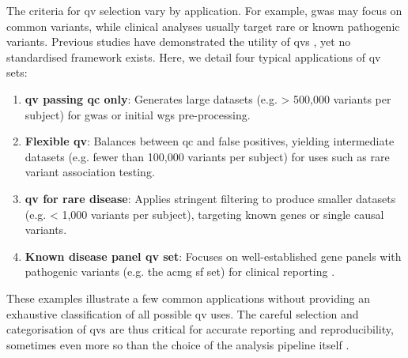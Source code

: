 The criteria for \ac{qv} selection vary by application. 
For example, \ac{gwas} may focus on common variants, while clinical analyses usually target rare or known pathogenic variants. 
Previous studies have demonstrated the utility of \ac{qv}s \cite{povysil2019rare, cirulli2015exome}, yet no standardised framework exists. 
Here, we detail four typical applications of \ac{qv} sets:
\begin{enumerate}
    \item \textbf{\ac{qv} passing \ac{qc} only}: Generates large datasets (e.g. > 500,000 variants per subject) for \ac{gwas} or initial \ac{wgs} pre-processing.
    \item \textbf{Flexible \ac{qv}}: Balances between \ac{qc} and false positives, yielding intermediate datasets (e.g. fewer than 100,000 variants per subject) for uses such as rare variant association testing.
    \item \textbf{\ac{qv} for rare disease}: Applies stringent filtering to produce smaller datasets (e.g. < 1,000 variants per subject), targeting known genes or single causal variants.
    \item \textbf{Known disease panel \ac{qv} set}: Focuses on well-established gene panels with pathogenic variants (e.g. the \ac{acmg} \ac{sf} set) for clinical reporting \cite{miller2023acmg}.
\end{enumerate}

 These examples illustrate a few common applications without providing an exhaustive classification of all possible \ac{qv} uses.
The careful selection and categorisation of \ac{qv}s are thus critical for accurate reporting and reproducibility, sometimes even more so than the choice of the analysis pipeline itself \cite{olson2023variant}.

